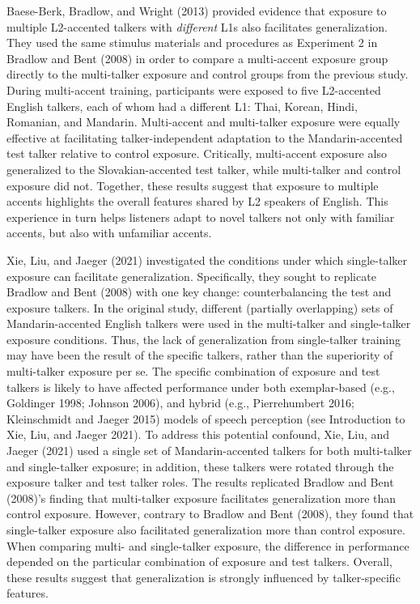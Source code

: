 \documentclass[
  preprint]{elsarticle}
\begin{document}
Baese-Berk, Bradlow, and Wright (2013) provided evidence that exposure to multiple L2-accented talkers with \emph{different} L1s also facilitates generalization.
They used the same stimulus materials and procedures as Experiment 2 in Bradlow and Bent (2008) in order to compare a multi-accent exposure group directly to the multi-talker exposure and control groups from the previous study.
During multi-accent training, participants were exposed to five L2-accented English talkers, each of whom had a different L1: Thai, Korean, Hindi, Romanian, and Mandarin.
Multi-accent and multi-talker exposure were equally effective at facilitating talker-independent adaptation to the Mandarin-accented test talker relative to control exposure.
Critically, multi-accent exposure also generalized to the Slovakian-accented test talker, while multi-talker and control exposure did not.
Together, these results suggest that exposure to multiple accents highlights the overall features shared by L2 speakers of English.
This experience in turn helps listeners adapt to novel talkers not only with familiar accents, but also with unfamiliar accents.

Xie, Liu, and Jaeger (2021) investigated the conditions under which single-talker exposure can facilitate generalization.
Specifically, they sought to replicate Bradlow and Bent (2008) with one key change: counterbalancing the test and exposure talkers.
In the original study, different (partially overlapping) sets of Mandarin-accented English talkers were used in the multi-talker and single-talker exposure conditions.
Thus, the lack of generalization from single-talker training may have been the result of the specific talkers, rather than the superiority of multi-talker exposure per se.
The specific combination of exposure and test talkers is likely to have affected performance under both exemplar-based (e.g., Goldinger 1998; Johnson 2006), and hybrid (e.g., Pierrehumbert 2016; Kleinschmidt and Jaeger 2015) models of speech perception (see Introduction to Xie, Liu, and Jaeger 2021).
To address this potential confound, Xie, Liu, and Jaeger (2021) used a single set of Mandarin-accented talkers for both multi-talker and single-talker exposure; in addition, these talkers were rotated through the exposure talker and test talker roles.
The results replicated Bradlow and Bent (2008)'s finding that multi-talker exposure facilitates generalization more than control exposure.
However, contrary to Bradlow and Bent (2008), they found that single-talker exposure also facilitated generalization more than control exposure.
When comparing multi- and single-talker exposure, the difference in performance depended on the particular combination of exposure and test talkers.
Overall, these results suggest that generalization is strongly influenced by talker-specific features.
\end{document}
